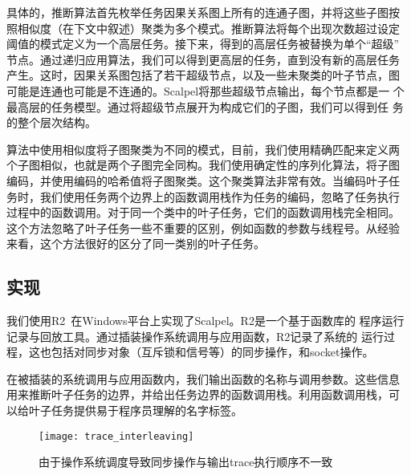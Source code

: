 具体的，推断算法首先枚举任务因果关系图上所有的连通子图，并将这些子图按
照相似度（在下文中叙述）聚类为多个模式。推断算法将每个出现次数超过设定
阈值的模式定义为一个高层任务。接下来，得到的高层任务被替换为单个“超级”
节点。通过递归应用算法，我们可以得到更高层的任务，直到没有新的高层任务
产生。这时，因果关系图包括了若干超级节点，以及一些未聚类的叶子节点，图
可能是连通也可能是不连通的。Scalpel将那些超级节点输出，每个节点都是一
个最高层的任务模型。通过将超级节点展开为构成它们的子图，我们可以得到任
务的整个层次结构。

算法中使用相似度将子图聚类为不同的模式，目前，我们使用精确匹配来定义两
个子图相似，也就是两个子图完全同构。我们使用确定性的序列化算法，将子图
编码，并使用编码的哈希值将子图聚类。这个聚类算法非常有效。当编码叶子任
务时，我们使用任务两个边界上的函数调用栈作为任务的编码，忽略了任务执行
过程中的函数调用。对于同一个类中的叶子任务，它们的函数调用栈完全相同。
这个方法忽略了叶子任务一些不重要的区别，例如函数的参数与线程号。从经验
来看，这个方法很好的区分了同一类别的叶子任务。



\subsection{实现}

我们使用R2~\cite{r2}在Windows平台上实现了Scalpel。R2是一个基于函数库的
程序运行记录与回放工具。通过插装操作系统调用与应用函数，R2记录了系统的
运行过程，这也包括对同步对象（互斥锁和信号等）的同步操作，和socket操作。

在被插装的系统调用与应用函数内，我们输出函数的名称与调用参数。这些信息
用来推断叶子任务的边界，并给出任务边界的函数调用栈。利用函数调用栈，可
以给叶子任务提供易于程序员理解的名字标签。


\begin{figure}
  \centering
  \begin{minipage}{0.8\linewidth}
    \centering
    \texttt{[image: trace\_interleaving]}
    \caption{由于操作系统调度导致同步操作与输出trace执行顺序不一致}
    \label{fig:trace_interleaving}
  \end{minipage}
\end{figure}

